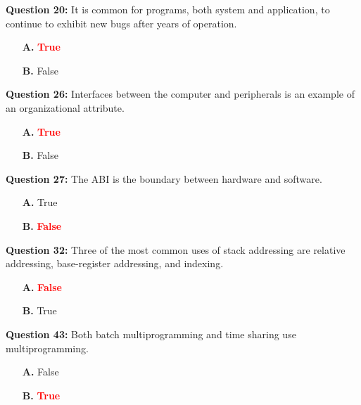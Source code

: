\documentclass[12pt,a4paper]{article}
\begin{document}
\vspace{0.5cm}

\textbf{Question 20:} It is common for programs, both system and application, to continue to exhibit new bugs after years of operation.

\begin{itemize}
    \item[\textbf{A.}] \textcolor{red}{\textbf{True}}
    \item[\textbf{B.}] False
\end{itemize}

\vspace{0.5cm}

\textbf{Question 26:} Interfaces between the computer and peripherals is an example of an organizational attribute.

\begin{itemize}
    \item[\textbf{A.}] \textcolor{red}{\textbf{True}}
    \item[\textbf{B.}] False
\end{itemize}

\vspace{0.5cm}

\textbf{Question 27:} The ABI is the boundary between hardware and software.

\begin{itemize}
    \item[\textbf{A.}] True
    \item[\textbf{B.}] \textcolor{red}{\textbf{False}}
\end{itemize}

\vspace{0.5cm}

\textbf{Question 32:} Three of the most common uses of stack addressing are relative addressing, base-register addressing, and indexing.

\begin{itemize}
    \item[\textbf{A.}] \textcolor{red}{\textbf{False}}
    \item[\textbf{B.}] True
\end{itemize}

\vspace{0.5cm}

\textbf{Question 43:} Both batch multiprogramming and time sharing use multiprogramming.

\begin{itemize}
    \item[\textbf{A.}] False
    \item[\textbf{B.}] \textcolor{red}{\textbf{True}}
\end{itemize}
\end{document}
